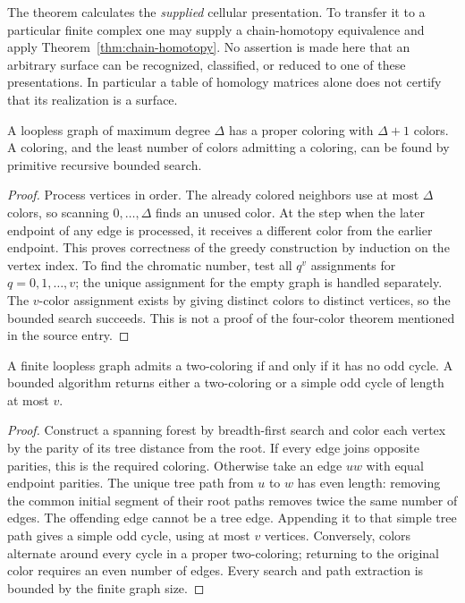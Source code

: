 The theorem calculates the \emph{supplied} cellular presentation.  To
transfer it to a particular finite complex one may supply a chain-homotopy
equivalence and apply Theorem~\ref{thm:chain-homotopy}.  No assertion is
made here that an arbitrary surface can be recognized, classified, or
reduced to one of these presentations.  In particular a table of homology
matrices alone does not certify that its realization is a surface.

\begin{proposition}
A loopless graph of maximum degree $\Delta$ has a proper coloring with
$\Delta+1$ colors.  A coloring, and the least number of colors admitting a
coloring, can be found by primitive recursive bounded search.
\end{proposition}
\begin{proof}
Process vertices in order.  The already colored neighbors use at most
$\Delta$ colors, so scanning $0,\ldots,\Delta$ finds an unused color.
At the step when the later endpoint of any edge is processed, it receives
a different color from the earlier endpoint.  This proves correctness of
the greedy construction by induction on the vertex index.  To find the
chromatic number, test all $q^v$ assignments for $q=0,1,\ldots,v$; the
unique assignment for the empty graph is handled separately.  The
$v$-color assignment exists by giving distinct colors to distinct
vertices, so the bounded search succeeds.  This is not a proof of the
four-color theorem mentioned in the source entry.
\end{proof}

\begin{theorem}
A finite loopless graph admits a two-coloring if and only if it has no
odd cycle.  A bounded algorithm returns either a two-coloring or a simple
odd cycle of length at most $v$.
\end{theorem}
\begin{proof}
Construct a spanning forest by breadth-first search and color each vertex
by the parity of its tree distance from the root.  If every edge joins
opposite parities, this is the required coloring.  Otherwise take an edge
$u w$ with equal endpoint parities.  The unique tree path from $u$ to
$w$ has even length: removing the common initial segment of their root
paths removes twice the same number of edges.  The offending edge cannot
be a tree edge.  Appending it to that simple tree path gives a simple odd
cycle, using at most $v$ vertices.  Conversely, colors alternate around
every cycle in a proper two-coloring; returning to the original color
requires an even number of edges.  Every search and path extraction is
bounded by the finite graph size.
\end{proof}

